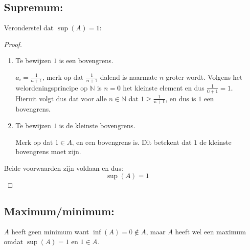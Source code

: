 \documentclass{article}
\newcommand{\N}{\mathbb{N}}
\newcommand{\f}[2]{\frac{#1}{#2}}
\begin{document}
\subsection*{Supremum:}
Veronderstel dat $\sup(A) = 1$:
\begin{proof}
\begin{enumerate}
    \item Te bewijzen $1$ is een bovengrens.

    $a_i = \f{1}{n+1}$, merk op dat $\f{1}{n+1}$ dalend is naarmate $n$ groter wordt.
    Volgens het welordeningsprincipe op $\N$ is $n=0$ het kleinste element en dus $\f{1}{0 + 1} = 1$.
    Hieruit volgt dus dat voor alle $n\in \N $ dat $1 \geq \f{1}{n + 1}$, en dus is $1$ een bovengrens.
    \item Te bewijzen $1$ is de kleinste bovengrens.

    Merk op dat $1 \in A$, en een bovengrens is. Dit betekent dat $1$ de kleinste bovengrens moet zijn. 
\end{enumerate}
Beide voorwaarden zijn voldaan en dus:
    \[\sup(A) = 1\]
\end{proof}
\subsection*{Maximum/minimum:}
$A$ heeft geen minimum want $\inf(A) = 0 \notin A$, maar $A$ heeft wel een maximum omdat $\sup(A) = 1$ en $1 \in A$. 
\end{document}
